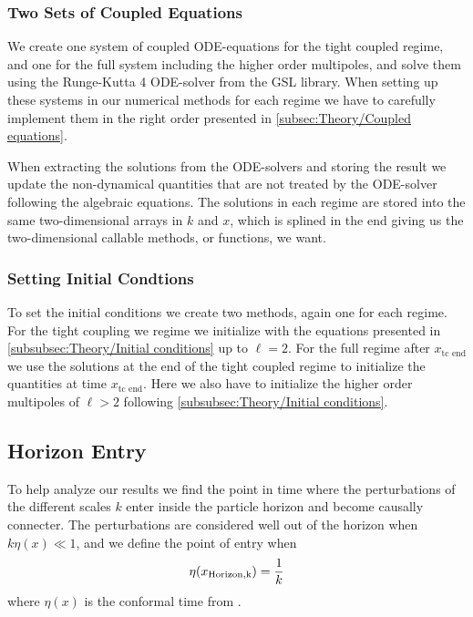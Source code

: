 \documentclass[10pt,a4paper]{article}
\begin{document}
\subsubsection{Two Sets of Coupled Equations}
\label{subsubsec:Method/Two ODE systems}
We create one system of coupled ODE-equations for the tight coupled regime, and one for the full system including the higher order multipoles, and solve them using the Runge-Kutta 4 ODE-solver from the GSL library. When setting up these systems in our numerical methods for each regime we have to carefully implement them in the right order presented in \cref{subsec:Theory/Coupled equations}.

When extracting the solutions from the ODE-solvers and storing the result we update the non-dynamical quantities that are not treated by the ODE-solver following the algebraic equations. The solutions in each regime are stored into the same two-dimensional arrays in $k$ and $x$, which is splined in the end giving us the two-dimensional callable methods, or functions, we want.

\subsubsection{Setting Initial Condtions}
\label{subsubsec:Method/setting initial conditions}
To set the initial conditions we create two methods, again one for each regime. For the tight coupling we regime we initialize with the equations presented in \cref{subsubsec:Theory/Initial conditions} up to $\ell = 2$. For the full regime after $x_{\textrm{tc end}}$ we use the solutions at the end of the tight coupled regime to initialize the quantities at time $x_{\textrm{tc end}}$. Here we also have to initialize the higher order multipoles of $\ell > 2$ following \cref{subsubsec:Theory/Initial conditions}.

\subsection{Horizon Entry}
\label{subsec:Method/Horizon entry}
To help analyze our results we find the point in time where the perturbations of the different scales $k$ enter inside the particle horizon and become causally connecter. The perturbations are considered well out of the horizon when $k\eta(x) \ll 1$, and we define the point of entry when
\begin{equation}
\eta(x_{\rm{Horizon,k}}) = \frac{1}{k}
\label{eq:Horizon entry}
\end{equation}
where $\eta(x)$ is the conformal time from \cite{milestone1}.
\end{document}
